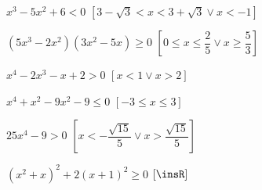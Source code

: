 \begin{esercizio}[\Ast]
\begin{enumeratea}
\item \(x^3-5x^2+6<0\) \hfill \(\left[3-\sqrt 3<x<3+\sqrt 3\vee x<-1\right]\)
\item \(\left(5x^3-2x^2\right)\left(3x^2-5x\right)\ge 0\) 
 \hfill \(\left[0\le x\le \dfrac 2 5\vee x\ge \dfrac 5 3\right]\)
\item \(x^4-2x^3-x+2>0\) \hfill \(\left[x<1\vee x>2\right]\)
\item \(x^4+x^2-9x^2-9\le 0\) \hfill \(\left[-3\le x\le 3\right]\)
\item \(25x^4-9>0\) 
 \hfill \(\left[x<-\dfrac{\sqrt{15}} 5\vee x>\dfrac{\sqrt{15}} 5\right]\)
\item \(\left(x^2+x\right)^2+2\left(x+1\right)^2\ge 0\) 
 \hfill \(\left[\insR\right]\)
\end{enumeratea}
\end{esercizio}
% 
% 
